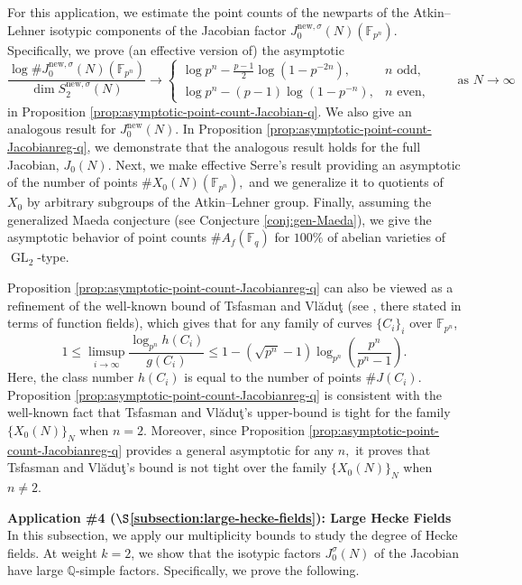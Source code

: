 \documentclass[11pt,letterpaper,reqno]{amsart}
\theoremstyle{definition}
\numberwithin{equation}{section}
\numberwithin{figure}{section}
\numberwithin{table}{section}
\newcommand{\QQ}{\mathbb{Q}}
\newcommand{\nw}{\mathrm{new}}
\begin{document}
For this application, we estimate the point counts of the newparts of the Atkin--Lehner isotypic components of the Jacobian factor $
J_0^{\nw,\sigma}(N)(\mathbb{F}_{p^n})$. Specifically, we prove (an effective version of) the asymptotic
\[
\frac{\log \#J_0^{\nw,\sigma}(N)(\mathbb F_{p^n})}
     {\dim S_2^{\nw, \sigma}(N)}
\longrightarrow
\begin{cases}
\displaystyle \log p^n - \frac{p-1}{2}\log\!\left(1-{p^{-2n}}\right),
& \text{$n$ odd},\\[10pt]
\displaystyle \log p^n - (p-1)\log\!\left(1-{p^{-n}}\right),
& \text{$n$ even},
\end{cases}
\qquad\text{as }N\to\infty
\]
in Proposition \ref{prop:asymptotic-point-count-Jacobian-q}. We also give an analogous result for $J_0^\nw(N)$. In Proposition \ref{prop:asymptotic-point-count-Jacobianreg-q}, we demonstrate that the analogous result holds for the full Jacobian, $J_0(N).$ Next, we make effective Serre's result \cite[Th\'eor\`eme 9]{Ser97} providing an asymptotic of the number of points $\#X_0(N)(\mathbb{F}_{p^n}),$ and we generalize it to quotients of $X_0$ by arbitrary subgroups of the Atkin--Lehner group. Finally, assuming the generalized Maeda conjecture (see Conjecture \ref{conj:gen-Maeda}), we give the asymptotic behavior of point counts $
\#A_f(\mathbb{F}_q)$ for $100\%$ of abelian varieties of $\operatorname{GL}_2$-type. 

Proposition \ref{prop:asymptotic-point-count-Jacobianreg-q} can also be viewed as a refinement of the well-known bound of Tsfasman and Vl{\u{a}}du{\c{t}} (see \cite[{Theorem G$'$}]{tsfasman2002infinite}, there stated in terms of function fields), which gives that for any family of curves $\{C_i\}_{i}$ over $\mathbb{F}_{p^n}$,
$$1 \leq \limsup_{i \rightarrow \infty} \frac{\log_{p^n} h(C_i)}{g(C_i)} \leq 1 - \left(\sqrt{p^n} - 1 \right) \log_{p^n} \left( \frac{p^n}{p^n - 1}  \right).$$
Here, the class number $h(C_i)$ is equal to the number of points $\#J(C_i).$ Proposition \ref{prop:asymptotic-point-count-Jacobianreg-q} is consistent with the well-known fact that Tsfasman and Vl{\u{a}}du{\c{t}}'s upper-bound is tight for the family $\{ X_0(N) \}_N$ when $n = 2.$ Moreover, since Proposition \ref{prop:asymptotic-point-count-Jacobianreg-q} provides a general asymptotic for any $n,$ it proves that Tsfasman and Vl{\u{a}}du{\c{t}}'s bound is not tight over the family $\{X_0(N) \}_N$ when $n \neq 2.$

\vspace{4mm}
\textbf{Application \#4 ($\S$\ref{subsection:large-hecke-fields}): Large Hecke Fields}
In this subsection, we apply our multiplicity bounds to study the degree of Hecke fields. At weight $k=2$, we show that the isotypic factors $J_0^\sigma(N)$ of the Jacobian have large $\QQ$-simple factors. Specifically, we prove the following.
\end{document}

